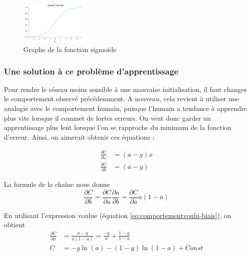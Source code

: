 \begin{figure}[h]
 \centering
 \includegraphics[width=0.3\textwidth]{img/sigmoid_function.png}
 \caption{Graphe de la fonction sigmoïde}
 \label{fig:sigmoid_function}
\end{figure}

\subsubsection{Une solution à ce problème d'apprentissage}
\label{subsubsection:etablissement-eq-entropiecroisee}

Pour rendre le réseau moins sensible à une mauvaise initialisation,
il faut changer le comportement observé précédemment. A nouveau, cela revient à utiliser une analogie avec le comportement humain, puisque l'humain a tendance à apprendre
plus vite lorsque il commet de fortes erreurs. On veut donc garder un apprentissage plus lent lorsque l'on se rapproche du minimum de la fonction
d'erreur. Ainsi, on aimerait obtenir ces équations :

\begin{align}
  \label{eq:comportementvoulu-poids}
  \frac{\partial C}{\partial \omega} &= \left(a-y\right)x \\
  \frac{\partial C}{\partial b} &= \left(a-y\right)
  \label{eq:comportementvoulu-biais}
\end{align}

La formule de la chaîne nous donne 
\begin{equation}
 \frac{\partial C}{\partial b} = \frac{\partial C}{\partial a} \frac{\partial a}{\partial b} = \frac{\partial C}{\partial a} a\left(1-a\right)
\end{equation}

En utilisant l'expression voulue (équation \ref{eq:comportementvoulu-biais}), on obtient 
\begin{align}
 \frac{\partial C}{\partial a} &= \frac{a-y}{a\left(1-a\right)} = \frac{-y}{a} + \frac{1-y}{1-a} \\
 C &= -y\ln\left(a\right) - \left(1-y\right)\ln\left(1-a\right) + Const
\end{align}

